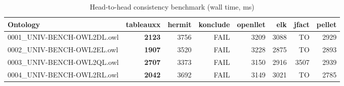 \begin{table}[t]
\centering
\caption{Head-to-head consistency benchmark (wall time, ms)}
\label{tab:head_to_head_wall_ms}
\begin{tabular}{lrrrrrrr}
\toprule
Ontology & tableauxx & hermit & konclude & openllet & elk & jfact & pellet \\
\midrule
0001\_UNIV-BENCH-OWL2DL.owl & \textbf{2123} & 3756 & FAIL & 3209 & 3088 & TO & 2929 \\
0002\_UNIV-BENCH-OWL2EL.owl & \textbf{1907} & 3520 & FAIL & 3228 & 2875 & TO & 2893 \\
0003\_UNIV-BENCH-OWL2QL.owl & \textbf{2707} & 3373 & FAIL & 3150 & 2916 & 3507 & 2939 \\
0004\_UNIV-BENCH-OWL2RL.owl & \textbf{2042} & 3692 & FAIL & 3149 & 3021 & TO & 2785 \\
\bottomrule
\end{tabular}
\end{table}
